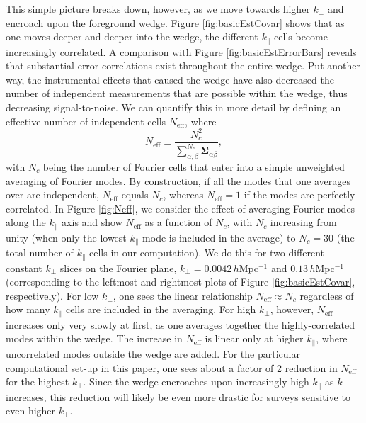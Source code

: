 \documentclass[twocolumn,aps,prd,nofootinbib,showpacs]{revtex4-1}
\begin{document}
This simple picture breaks down, however, as we move towards higher $k_\perp$ and encroach upon the foreground wedge.  Figure \ref{fig:basicEstCovar} shows that as one moves deeper and deeper into the wedge, the different $k_\parallel$ cells become increasingly correlated.  A comparison with Figure \ref{fig:basicEstErrorBars} reveals that substantial error correlations exist throughout the entire wedge.  Put another way, the instrumental effects that caused the wedge have also decreased the number of independent measurements that are possible within the wedge, thus decreasing signal-to-noise.  We can quantify this in more detail by defining an effective number of independent cells $N_\textrm{eff}$, where
\begin{equation}
N_\textrm{eff} \equiv \frac{N_c^2}{\sum_{\alpha,\beta}^{N_c} \overline{\boldsymbol \Sigma}_{\alpha \beta}},
\end{equation}
with $N_c$ being the number of Fourier cells that enter into a simple unweighted averaging of Fourier modes.  By construction, if all the modes that one averages over are independent, $N_\textrm{eff}$ equals $N_c$, whereas $N_\textrm{eff} = 1$ if the modes are perfectly correlated.  In Figure \ref{fig:Neff}, we consider the effect of averaging Fourier modes along the $k_\parallel$ axis and show $N_\textrm{eff}$ as a function of $N_c$, with $N_c$ increasing from unity (when only the lowest $k_\parallel$ mode is included in the average) to $N_c = 30$ (the total number of $k_\parallel$ cells in our computation).  We do this for two different constant $k_\perp$ slices on the Fourier plane, $k_\perp = 0.0042\,h$Mpc$^{-1}$ and $0.13\,h$Mpc$^{-1}$ (corresponding to the leftmost and rightmost plots of Figure \ref{fig:basicEstCovar}, respectively).  For low $k_\perp$, one sees the linear relationship $N_\textrm{eff} \approx N_c$ regardless of how many $k_\parallel$ cells are included in the averaging.  For high $k_\perp$, however, $N_\textrm{eff}$ increases only very slowly at first, as one averages together the highly-correlated modes within the wedge.  The increase in $N_\textrm{eff}$ is linear only at higher $k_\parallel$, where uncorrelated modes outside the wedge are added.  For the particular computational set-up in this paper, one sees about a factor of 2 reduction in $N_\textrm{eff}$ for the highest $k_\perp$.  Since the wedge encroaches upon increasingly high $k_\parallel$ as $k_\perp$ increases, this reduction will likely be even more drastic for surveys sensitive to even higher $k_\perp$.
\end{document}

